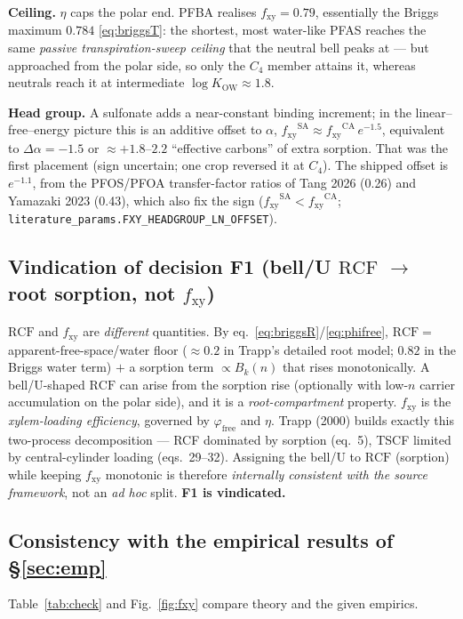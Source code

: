 \documentclass[11pt]{article}
\newcommand{\fxy}{\ensuremath{f_{\mathrm{xy}}}}
\newcommand{\Bk}{\ensuremath{B_{k}}}
\newcommand{\Kow}{\ensuremath{K_{\mathrm{OW}}}}
\newcommand{\RCF}{\ensuremath{\mathrm{RCF}}}
\newcommand{\ffree}{\ensuremath{\varphi_{\mathrm{free}}}}
\begin{document}
\noindent\textbf{Ceiling.} $\eta$ caps the polar end. PFBA realises $\fxy=0.79$, essentially the
Briggs maximum $0.784$ \eqref{eq:briggsT}: the shortest, most water-like PFAS reaches the same
\emph{passive transpiration-sweep ceiling} that the neutral bell peaks at --- but approached from
the polar side, so only the $C_4$ member attains it, whereas neutrals reach it at intermediate
$\log\Kow\approx1.8$.

\noindent\textbf{Head group.} A sulfonate adds a near-constant binding increment; in the
linear--free--energy picture this is an additive offset to $\alpha$,
$\fxy^{\mathrm{SA}}\approx\fxy^{\mathrm{CA}}\,e^{-1.5}$, equivalent to
$\Delta\alpha=-1.5$ or $\approx+1.8$--$2.2$ ``effective carbons'' of extra sorption. That was the
first placement (sign uncertain; one crop reversed it at $C_4$). The shipped offset is
$e^{-1.1}$, from the PFOS/PFOA transfer-factor ratios of Tang 2026 (0.26) and Yamazaki 2023
(0.43), which also fix the sign ($\fxy^{\mathrm{SA}}<\fxy^{\mathrm{CA}}$;
\texttt{literature\_params.FXY\_HEADGROUP\_LN\_OFFSET}).

\subsection{Vindication of decision F1 (bell/U $\RCF$ $\to$ root sorption, not $\fxy$)}
$\RCF$ and $\fxy$ are \emph{different} quantities. By eq.~\eqref{eq:briggsR}/\eqref{eq:phifree},
$\RCF=$ apparent-free-space/water floor ($\approx0.2$ in Trapp's detailed root model; $0.82$ in the
Briggs water term) $+$ a sorption term $\propto\Bk(n)$ that rises monotonically. A
bell/U-shaped \RCF{} can arise from the sorption rise (optionally with low-$n$ carrier accumulation
on the polar side), and it is a \emph{root-compartment} property. $\fxy$ is the \emph{xylem-loading
efficiency}, governed by $\ffree$ and $\eta$. Trapp (2000) builds exactly this two-process
decomposition --- RCF dominated by sorption (eq.~5), TSCF limited by central-cylinder loading
(eqs.~29--32). Assigning the bell/U to \RCF{} (sorption) while keeping $\fxy$ monotonic is therefore
\emph{internally consistent with the source framework}, not an \emph{ad hoc} split. \textbf{F1 is
vindicated.}

\subsection{Consistency with the empirical results of \S\ref{sec:emp}}
Table~\ref{tab:check} and Fig.~\ref{fig:fxy} compare theory and the given empirics.
\end{document}
